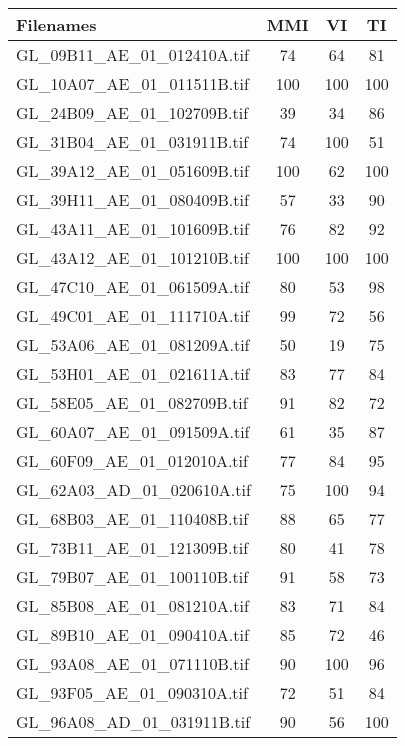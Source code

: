 \begin{tabular}{lccc}
\hline
 Filenames                            & MMI & VI  & TI  \\ \hline \hline
 GL\_09B11\_AE\_01\_012410A.tif & 74  & 64  & 81  \\
 GL\_10A07\_AE\_01\_011511B.tif & 100 & 100 & 100 \\
 GL\_24B09\_AE\_01\_102709B.tif & 39  & 34  & 86  \\
 GL\_31B04\_AE\_01\_031911B.tif & 74  & 100 & 51  \\
 GL\_39A12\_AE\_01\_051609B.tif & 100 & 62  & 100 \\
 GL\_39H11\_AE\_01\_080409B.tif & 57  & 33  & 90  \\
 GL\_43A11\_AE\_01\_101609B.tif & 76  & 82  & 92  \\
 GL\_43A12\_AE\_01\_101210B.tif & 100 & 100 & 100 \\
 GL\_47C10\_AE\_01\_061509A.tif & 80  & 53  & 98  \\
 GL\_49C01\_AE\_01\_111710A.tif & 99  & 72  & 56  \\
 GL\_53A06\_AE\_01\_081209A.tif & 50  & 19  & 75  \\
 GL\_53H01\_AE\_01\_021611A.tif & 83  & 77  & 84  \\
 GL\_58E05\_AE\_01\_082709B.tif & 91  & 82  & 72  \\
 GL\_60A07\_AE\_01\_091509A.tif & 61  & 35  & 87  \\
 GL\_60F09\_AE\_01\_012010A.tif & 77  & 84  & 95  \\
 GL\_62A03\_AD\_01\_020610A.tif & 75  & 100 & 94  \\
 GL\_68B03\_AE\_01\_110408B.tif & 88  & 65  & 77  \\
 GL\_73B11\_AE\_01\_121309B.tif & 80  & 41  & 78  \\
 GL\_79B07\_AE\_01\_100110B.tif & 91  & 58  & 73  \\
 GL\_85B08\_AE\_01\_081210A.tif & 83  & 71  & 84  \\
 GL\_89B10\_AE\_01\_090410A.tif & 85  & 72  & 46  \\
 GL\_93A08\_AE\_01\_071110B.tif & 90  & 100 & 96  \\
 GL\_93F05\_AE\_01\_090310A.tif & 72  & 51  & 84  \\
 GL\_96A08\_AD\_01\_031911B.tif & 90  & 56  & 100 \\
\hline
\end{tabular}